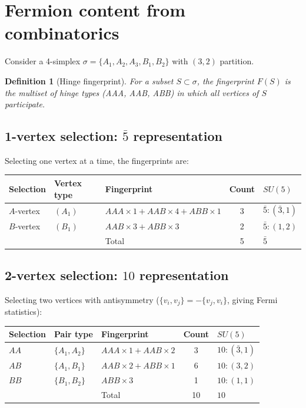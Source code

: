 \documentclass[12pt,a4paper]{article}
\newtheorem{definition}[theorem]{Definition}
\begin{document}
\section{Fermion content from combinatorics}
\label{sec:fermion}

Consider a 4-simplex $\sigma = \{A_1,A_2,A_3,B_1,B_2\}$ with
$(3,2)$ partition.

\begin{definition}[Hinge fingerprint]
For a subset $S \subset \sigma$, the fingerprint $F(S)$ is the
multiset of hinge types (AAA, AAB, ABB) in which all vertices
of $S$ participate.
\end{definition}

\subsection{1-vertex selection: $\bar{5}$ representation}

Selecting one vertex at a time, the fingerprints are:

\begin{center}
\begin{tabular}{lllcl}
\toprule
Selection & Vertex type & Fingerprint & Count & $SU(5)$ \\
\midrule
$A$-vertex & $(A_1)$ & $AAA{\times}1 + AAB{\times}4 + ABB{\times}1$ & 3 & $\bar{5}: (\bar{3},1)$ \\
$B$-vertex & $(B_1)$ & $AAB{\times}3 + ABB{\times}3$ & 2 & $\bar{5}: (1,2)$ \\
\midrule
& & Total & 5 & $\bar{5}$ \\
\bottomrule
\end{tabular}
\end{center}

\subsection{2-vertex selection: $10$ representation}

Selecting two vertices with antisymmetry
($\{v_i,v_j\} = -\{v_j,v_i\}$, giving Fermi statistics):

\begin{center}
\begin{tabular}{lllcl}
\toprule
Selection & Pair type & Fingerprint & Count & $SU(5)$ \\
\midrule
$AA$ & $\{A_1,A_2\}$ & $AAA{\times}1 + AAB{\times}2$ & 3 & $10: (\bar{3},1)$ \\
$AB$ & $\{A_1,B_1\}$ & $AAB{\times}2 + ABB{\times}1$ & 6 & $10: (3,2)$ \\
$BB$ & $\{B_1,B_2\}$ & $ABB{\times}3$ & 1 & $10: (1,1)$ \\
\midrule
& & Total & 10 & $10$ \\
\bottomrule
\end{tabular}
\end{center}
\end{document}
